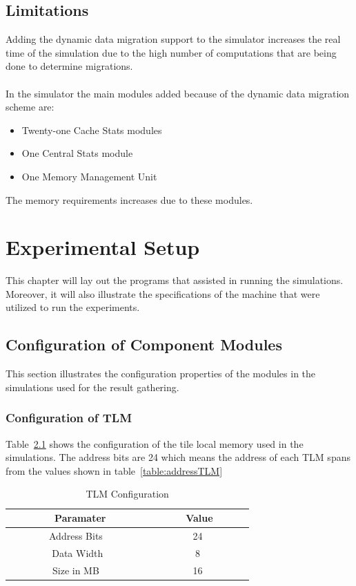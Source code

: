 \documentclass{listhesis}
\begin{document}
\section{Limitations}
Adding the dynamic data migration support to the simulator increases the real time of the simulation due to the high number of computations that are being done to determine migrations. \\
\\
In the simulator the main modules added because of the dynamic data migration scheme are:
\begin{itemize}
  \item Twenty-one Cache Stats modules
  \item One Central Stats module 
  \item One Memory Management Unit
\end{itemize}
The memory requirements increases due to these modules. 

\chapter{Experimental Setup}
This chapter will lay out the programs that assisted in running the simulations. Moreover, it will also illustrate the specifications of the machine that were utilized to run the experiments.
\section{Configuration of Component Modules}
This section illustrates the configuration properties of the modules in the simulations used for the result gathering.
\subsection{Configuration of TLM}
Table~\ref{table:Size} shows the configuration of the tile local memory used in the simulations. The address bits are 24 which means the address of each TLM spans from the values shown in table~\ref{table:addressTLM}
\begin{table}[h!]
\begin{center}
 \begin{tabular}{|| c | c ||} 
 \hline
 \ \textbf{Paramater} & \textbf{Value}  \\ [0.5 ex] 
 \hline\hline
 \ \ \ \ \ \ \ \ Address Bits \ \ \ \ \ \ \ \ & \ \ \ \ \ \ \ \ 24 \ \ \ \ \ \ \ \ \\ 
 \hline
 \ \ \ \ \ \ \ \ Data Width\ \ \ \ \ \ \ \ & \ \ \ \ \ \ \ \ 8 \ \ \ \ \ \ \ \ \\
 \hline
 \ \ \ \ \ \ \ \ Size in MB \ \ \ \ \ \ \ \ & \ \ \ \ \ \ \ \ 16 \ \ \ \ \ \ \ \  \\
 \hline
\end{tabular}
 \caption{TLM Configuration}
 \label{table:Size}
\end{center}
\end{table}
\end{document}
